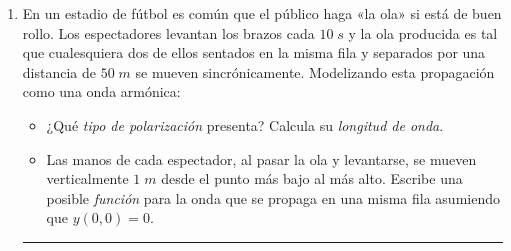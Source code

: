 \documentclass[a4paper,14pt]{exam}
\newcommand{\halmos}{\vspace*{-7mm}
	
					\begin{flushright}
						\rule{1mm}{2.5mm} 
					\end{flushright}\vspace*{-6mm}
						
					  }
\renewcommand{\qed}{\halmos}
\begin{document}
\begin{enumerate}
		\item En un estadio de fútbol es común que el público haga «la ola» si está de buen rollo. Los espectadores levantan los brazos cada $10\;s$ y la ola producida es tal que cualesquiera dos de ellos sentados en la misma fila y separados por una distancia de $50\;m$ se mueven sincrónicamente. Modelizando esta propagación  como una onda armónica:
		\begin{itemize}
		\item[a)] ¿Qué \textit{tipo de polarización} presenta? Calcula su \textit{longitud de onda}.			
		\item[b)] Las manos de cada espectador, al pasar la ola y levantarse, se mueven verticalmente $1\;m$ desde el punto más bajo al más alto. Escribe una posible \textit{función} para la onda que se propaga en una misma fila asumiendo que $y(0,0)=0$.
		\end{itemize}
		\qed
		
\end{enumerate}		
 
\end{document}

